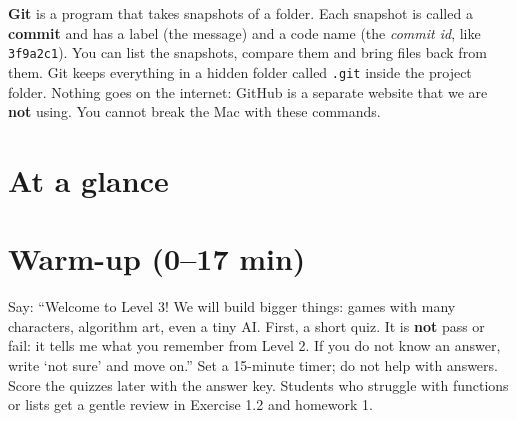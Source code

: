 \begin{teachernote}
\textbf{Git} is a program that takes snapshots of a folder. Each snapshot is called a \textbf{commit} and has a label (the message) and a code name (the \emph{commit id}, like \texttt{3f9a2c1}). You can list the snapshots, compare them and bring files back from them. Git keeps everything in a hidden folder called \texttt{.git} inside the project folder. Nothing goes on the internet: GitHub is a separate website that we are \textbf{not} using. You cannot break the Mac with these commands.
\end{teachernote}

\section{At a glance}
\begin{timeplan}
\end{timeplan}

\section{Warm-up (0--17 min)}
Say: \enquote{Welcome to Level 3! We will build bigger things: games with many characters, algorithm art, even a tiny AI. First, a short quiz. It is \textbf{not} pass or fail: it tells me what you remember from Level 2. If you do not know an answer, write \enquote{not sure} and move on.} Set a 15-minute timer; do not help with answers. Score the quizzes later with the answer key. Students who struggle with functions or lists get a gentle review in Exercise 1.2 and homework 1.

